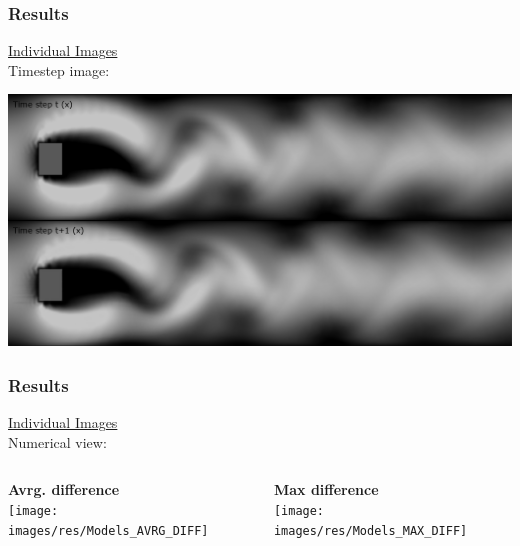 \documentclass[18pt]{beamer}
\begin{document}
\begin{frame}[t]
  \frametitle{Results}
  \vspace{-1cm}
  \begin{center}
    {\large \underline{Individual Images}} \\
    Timestep image:
  \end{center}

  \begin{center}
    \includegraphics[scale=0.32]{images/res/timestep}
  \end{center}  
\end{frame}

\begin{frame}[t]
  \frametitle{Results}
  \vspace{-1cm}
  \begin{center}
    {\large \underline{Individual Images}} \\
    Numerical view:
  \end{center}
  \vspace{-0.8cm}
  \begin{columns}[t]
    \begin{column}{0.5\textwidth}
      \begin{center}
        \textbf{Avrg. difference} \\
        \texttt{[image: images/res/Models\_AVRG\_DIFF]}
      \end{center}
    \end{column}
    \begin{column}{0.5\textwidth}
      \begin{center}
        \textbf{Max difference} \\
        \texttt{[image: images/res/Models\_MAX\_DIFF]}
      \end{center}
    \end{column}
  \end{columns}
\end{frame}
\end{document}
